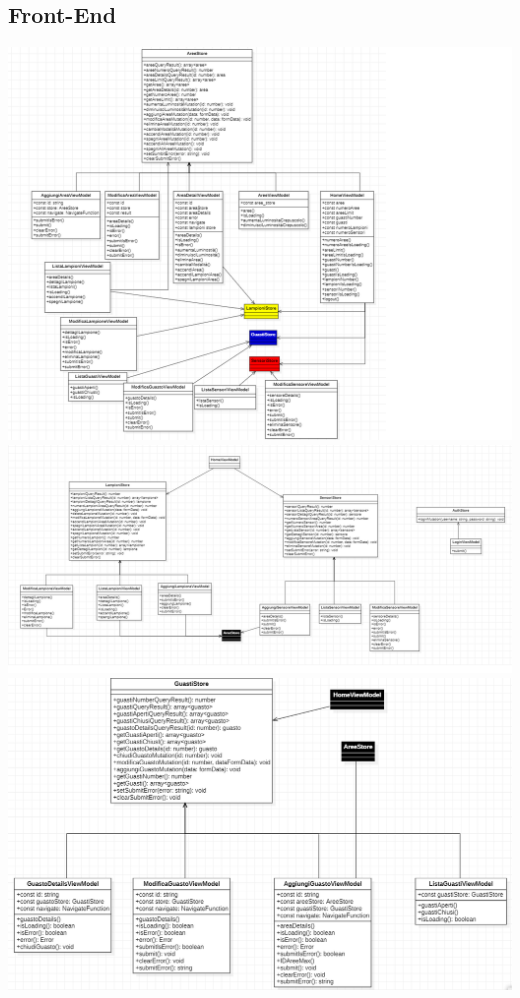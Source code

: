 \documentclass[12pt]{article}
\begin{document}
\subsection{Front-End}
\includegraphics[width=475pt]{Front-End.png}
\clearpage
\includegraphics[width=475pt]{Front-End2.png}
\includegraphics[width=475pt]{Guasti.png}
\end{document}
